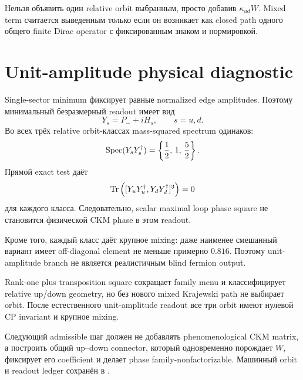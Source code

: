 \begin{nogocriterion}
Нельзя объявить один relative orbit выбранным, просто добавив
\(\kappa_{ud}W\). Mixed term считается выведенным только если он возникает
как closed path одного общего finite Dirac operator с фиксированным знаком и
нормировкой.
\end{nogocriterion}

\section{Unit-amplitude physical diagnostic}

Single-sector minimum фиксирует равные normalized edge amplitudes. Поэтому
минимальный безразмерный readout имеет вид
\begin{equation}
 Y_s=P_-+iH_s,
 \qquad s=u,d.
\end{equation}
Во всех трёх relative orbit-классах mass-squared spectrum одинаков:
\begin{equation}
 \operatorname{Spec}(Y_sY_s^\dagger)=
 \left\{\frac12,\,1,\,\frac52\right\}.
\end{equation}
Прямой exact test даёт
\begin{equation}
 \operatorname{Tr}\left([Y_uY_u^\dagger,Y_dY_d^\dagger]^3\right)=0
\end{equation}
для каждого класса. Следовательно, scalar maximal loop phase square не
становится физической CKM phase в этом readout.

Кроме того, каждый класс даёт крупное mixing: даже наименее смешанный
вариант имеет off-diagonal element не меньше примерно \(0.816\). Поэтому
unit-amplitude branch не является реалистичным blind fermion output.

\begin{theorem}
Rank-one plus transposition square сокращает family menu и классифицирует
relative up/down geometry, но без нового mixed Krajewski path не выбирает
orbit. После естественного unit-amplitude readout все три orbit имеют
нулевой CP invariant и крупное mixing.
\end{theorem}

Следующий admissible шаг должен не добавлять phenomenological CKM matrix, а
построить общий up--down connector, который одновременно порождает
\(W\), фиксирует его coefficient и делает phase family-nonfactorizable.
Машинный orbit и readout ledger сохранён в
.